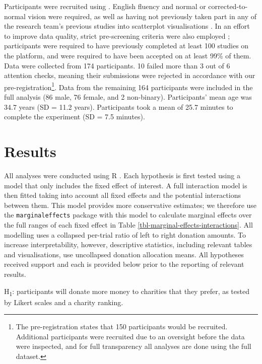 \documentclass[
  authoryear,
  preprint,
  3p]{elsarticle}
\begin{document}
Participants were recruited using \citet{prolific}. English fluency and
normal or corrected-to-normal vision were required, as well as having
not previously taken part in any of the research team's previous studies
into scatterplot visualisations
\citep{strain_2023, strain_2023a, strain_2024, strain_2025}. In an
effort to improve data quality, strict pre-screening criteria were also
employed \citep{peer_2021}; participants were required to have
previously completed at least 100 studies on the platform, and were
required to have been accepted on at least 99\% of them. Data were
collected from 174 participants. 10 failed more than 3 out of 6
attention checks, meaning their submissions were rejected in accordance
with our pre-registration\footnote{The pre-registration states that 150
  participants would be recruited. Additional participants were
  recruited due to an oversight before the data were inspected, and for
  full transparency all analyses are done using the full dataset.}. Data
from the remaining 164 participants were included in the full analysis
(86 male, 76 female, and 2 non-binary). Participants' mean age was 34.7
years (SD = 11.2 years). Participants took a mean of 25.7 minutes to
complete the experiment (SD = 7.5 minutes).

\section{Results}\label{sec-results}

All analyses were conducted using R \citep[version 4.5.3,][]{r_core}.
Each hypothesis is first tested using a model that only includes the
fixed effect of interest. A full interaction model is then fitted taking
into account all fixed effects and the potential interactions between
them. This model provides more conservative estimates; we therefore use
the \texttt{marginaleffects} package \citep[version
1.0.0,][]{arel-bundock_2024} with this model to calculate marginal
effects over the full ranges of each fixed effect in Table
\ref{tbl-marginal-effects-interactions}. All modelling uses a collapsed
per-trial ratio of left to right donation amounts. To increase
interpretability, however, descriptive statistics, including relevant
tables and visualisations, use uncollapsed donation allocation means.
All hypotheses received support and each is provided below prior to the
reporting of relevant results.


\hspace{0pt}
\begin{tcolorbox}[colback=nicegreen, colframe=gray!50, boxrule=0.5pt]
  H\textsubscript{1}: participants will donate more money to charities that they prefer, as tested by Likert scales and a charity ranking.
\end{tcolorbox}
\hspace{0pt}
\end{document}
